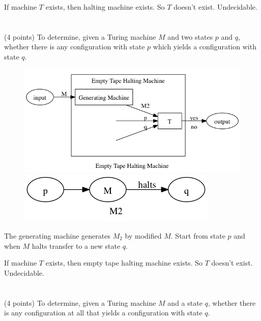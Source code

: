 \documentclass[paper=a4, fontsize=11pt]{scrartcl} %
\begin{document}
If machine $T$ exists, then halting machine exists. So $T$ doesn't
exist. Undecidable.


\section{}
\begin{fancyquotes}
  (4 points) To determine, given a Turing machine $M$ and two
  states $p$ and $q$, whether there is any configuration with state
  $p$ which yields a configuration with state $q$.
\end{fancyquotes}

\begin{figure}[H]
  \centering
  \includegraphics[width=\textwidth]{9-2.gv.png}
  \includegraphics[width=.5\textwidth]{9-2.gv.2.png}
\end{figure}

The generating machine generates $M_2$ by modified $M$. Start from
state $p$ and when $M$ halts transfer to a new state $q$.

If machine $T$ exists, then empty tape halting machine exists. So $T$
doesn't exist. Undecidable.


\section{}
\begin{fancyquotes}
  (4 points) To determine, given a Turing machine $M$ and a state
  $q$, whether there is any configuration at all that yields a
  configuration with state $q$.
\end{fancyquotes}
\end{document}
